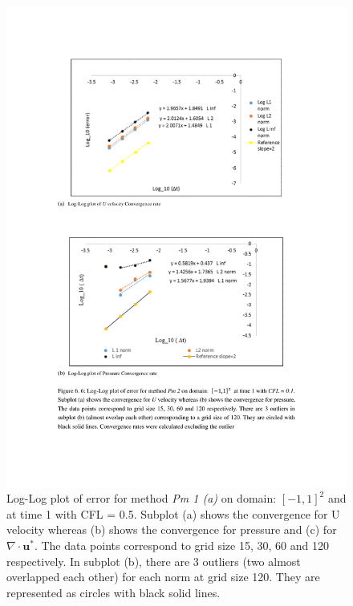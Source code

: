 \begin{figure}[H]
	\centering
	\includegraphics[scale=0.9]{figures/Pm2_pf2_rate_t_1_cfl_0_1.pdf}
	\caption{Log-Log plot of error for method \textit{Pm 1 (a)} on domain: $[-1,1]^2$ and at time 1 with CFL = 0.5. Subplot (a) shows the convergence for U velocity whereas (b) shows the convergence for pressure and (c) for $\nabla \cdot \textbf{u}^*$. The data points correspond to grid size 15, 30, 60 and 120 respectively. In subplot (b), there are 3 outliers (two almost overlapped each other) for each norm at grid size 120. They are represented as circles with black solid lines.}\label{fig:6.6}
\end{figure}

